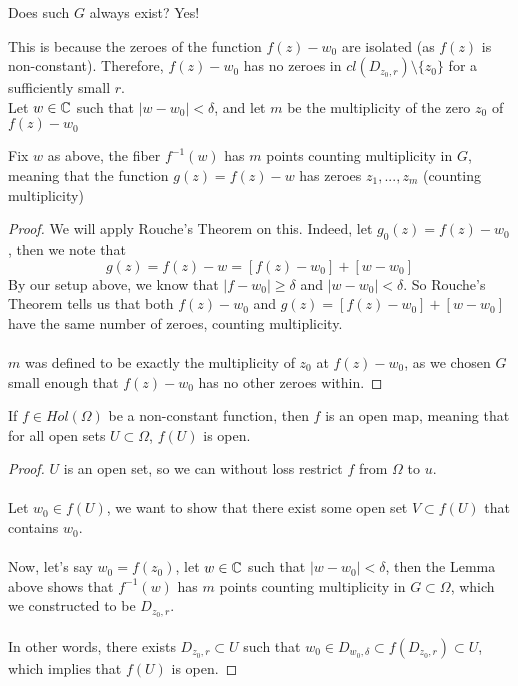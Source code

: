 \documentclass{article}
\begin{document}
Does such $G$ always exist? Yes!

This is because the zeroes of the function $f(z) - w_0$ are isolated (as $f(z)$ is non-constant). Therefore, $f(z) - w_0$ has no zeroes in $cl(D_{z_0, r}) \setminus \{z_0\}$ for a sufficiently small $r$.\\

Let $w \in \mathbb{C}$ such that $|w - w_0| < \delta$, and let $m$ be the multiplicity of the zero $z_0$ of $f(z) - w_0$

\begin{lemma}
Fix $w$ as above, the fiber $f^{-1}(w)$ has $m$ points counting multiplicity in $G$, meaning that the function $g(z) = f(z) - w$ has zeroes $z_1, ..., z_m$ (counting multiplicity)
\end{lemma}

\begin{proof}
We will apply Rouche's Theorem on this. Indeed, let $g_0(z) = f(z) - w_0$, then we note that
\[g(z) = f(z) - w = [f(z) - w_0] + [w - w_0]\]
By our setup above, we know that $|f - w_0| \geq \delta$ and $|w - w_0| < \delta$. So Rouche's Theorem tells us that both $f(z) - w_0$ and $g(z) = [f(z) - w_0] + [w - w_0]$ have the same number of zeroes, counting multiplicity.\\\\
$m$ was defined to be exactly the multiplicity of $z_0$ at $f(z) - w_0$, as we chosen $G$ small enough that $f(z) - w_0$ has no other zeroes within. 
\end{proof}

\begin{corollary}
If $f \in Hol(\Omega)$ be a non-constant function, then $f$ is an open map, meaning that for all open sets $U \subset \Omega$, $f(U)$ is open.
\end{corollary}

\begin{proof}
$U$ is an open set, so we can without loss restrict $f$ from $\Omega$ to $u$.\\\\
Let $w_0 \in f(U)$, we want to show that there exist some open set $V \subset f(U)$ that contains $w_0$.\\\\
Now, let's say $w_0 = f(z_0)$, let $w \in \mathbb{C}$ such that $|w - w_0| < \delta$, then the Lemma above shows that $f^{-1}(w)$ has $m$ points counting multiplicity in $G \subset \Omega$, which we constructed to be $D_{z_0, r}$.\\\\
In other words, there exists $D_{z_0, r} \subset U$ such that $w_0 \in D_{w_0, \delta} \subset f(D_{z_0, r}) \subset U$, which implies that $f(U)$ is open.
\end{proof}
\end{document}
